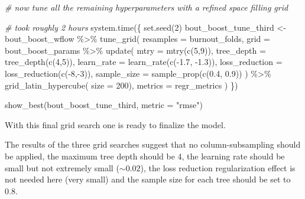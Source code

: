 \documentclass[
]{book}
\newenvironment{Shaded}{\begin{snugshade}}{\end{snugshade}}
\newcommand{\AttributeTok}[1]{\textcolor[rgb]{0.77,0.63,0.00}{#1}}
\newcommand{\CommentTok}[1]{\textcolor[rgb]{0.56,0.35,0.01}{\textit{#1}}}
\newcommand{\DecValTok}[1]{\textcolor[rgb]{0.00,0.00,0.81}{#1}}
\newcommand{\FloatTok}[1]{\textcolor[rgb]{0.00,0.00,0.81}{#1}}
\newcommand{\FunctionTok}[1]{\textcolor[rgb]{0.00,0.00,0.00}{#1}}
\newcommand{\NormalTok}[1]{#1}
\newcommand{\OtherTok}[1]{\textcolor[rgb]{0.56,0.35,0.01}{#1}}
\newcommand{\SpecialCharTok}[1]{\textcolor[rgb]{0.00,0.00,0.00}{#1}}
\newcommand{\StringTok}[1]{\textcolor[rgb]{0.31,0.60,0.02}{#1}}
\begin{document}
\begin{Shaded}
\begin{Highlighting}[]
\CommentTok{\# now tune all the remaining hyperparameters with a refined space filling grid}

\CommentTok{\# took roughly 2 hours}
\FunctionTok{system.time}\NormalTok{(\{}
  \FunctionTok{set.seed}\NormalTok{(}\DecValTok{2}\NormalTok{)}
\NormalTok{  bout\_boost\_tune\_third }\OtherTok{\textless{}{-}}\NormalTok{ bout\_boost\_wflow }\SpecialCharTok{\%\textgreater{}\%}
    \FunctionTok{tune\_grid}\NormalTok{(}
      \AttributeTok{resamples =}\NormalTok{ burnout\_folds,}
      \AttributeTok{grid =}\NormalTok{ bout\_boost\_params }\SpecialCharTok{\%\textgreater{}\%}
        \FunctionTok{update}\NormalTok{(}
          \AttributeTok{mtry =} \FunctionTok{mtry}\NormalTok{(}\FunctionTok{c}\NormalTok{(}\DecValTok{5}\NormalTok{,}\DecValTok{9}\NormalTok{)),}
          \AttributeTok{tree\_depth =} \FunctionTok{tree\_depth}\NormalTok{(}\FunctionTok{c}\NormalTok{(}\DecValTok{4}\NormalTok{,}\DecValTok{5}\NormalTok{)),}
          \AttributeTok{learn\_rate =} \FunctionTok{learn\_rate}\NormalTok{(}\FunctionTok{c}\NormalTok{(}\SpecialCharTok{{-}}\FloatTok{1.7}\NormalTok{, }\SpecialCharTok{{-}}\FloatTok{1.3}\NormalTok{)),}
          \AttributeTok{loss\_reduction =} \FunctionTok{loss\_reduction}\NormalTok{(}\FunctionTok{c}\NormalTok{(}\SpecialCharTok{{-}}\DecValTok{8}\NormalTok{,}\SpecialCharTok{{-}}\DecValTok{3}\NormalTok{)),}
          \AttributeTok{sample\_size =} \FunctionTok{sample\_prop}\NormalTok{(}\FunctionTok{c}\NormalTok{(}\FloatTok{0.4}\NormalTok{, }\FloatTok{0.9}\NormalTok{))}
\NormalTok{        ) }\SpecialCharTok{\%\textgreater{}\%}
        \FunctionTok{grid\_latin\_hypercube}\NormalTok{(}
          \AttributeTok{size =} \DecValTok{200}\NormalTok{),}
      \AttributeTok{metrics =}\NormalTok{ regr\_metrics}
\NormalTok{    )}
\NormalTok{\})}

\FunctionTok{show\_best}\NormalTok{(bout\_boost\_tune\_third, }\AttributeTok{metric =} \StringTok{"rmse"}\NormalTok{)}
\end{Highlighting}
\end{Shaded}

With this final grid search one is ready to finalize the model.

The results of the three grid searches suggest that no column-subsampling should be applied, the maximum tree depth should be 4, the learning rate should be small but not extremely small (\(\sim 0.02\)), the loss reduction regularization effect is not needed here (very small) and the sample size for each tree should be set to 0.8.
\end{document}
